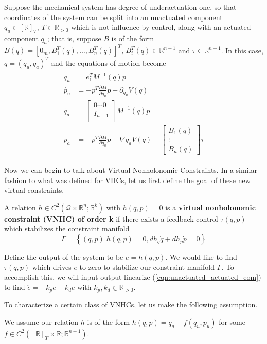 Suppose the mechanical system has degree of underactuation one, so that coordinates of the system can be split into an unactuated component \(q_u \in [\mathbb{R}]_T, \, T \in \mathbb{R}_{>0}\) which is not influence by control, along with an actuated component \(q_a\); that is, suppose \(B\) is of the form \(B(q) = [0_m, B_1^T(q), \ldots, B_n^T(q)]^T, \, B_i^T(q) \in \mathbb{R}^{n-1}\) and \(\tau \in \mathbb{R}^{n-1}\). In this case, \(q = (q_u, q_a)^T\) and the equations of motion become
\begin{align}\label{eqn:unactuated_actuated_eom}
\begin{split}
\dot{q_u} &= e_1^T M^{-1}(q) p \\
\dot{p_u} &= -p^T\frac{\partial M}{\partial q_u} p - \partial_{q_u}V(q) \\
\dot{q_a} &= 
\begin{bmatrix}
0 \cdots 0 \\
I_{n-1} \\
\end{bmatrix} M^{-1}(q) p \\
\dot{p_a} &= -p^T\frac{\partial M}{\partial q_a} p - \nabla{q_a}V(q) + 
\begin{bmatrix}
B_1(q) \\
\vdots \\
B_n(q)
\end{bmatrix} \tau
\end{split}
\end{align}

Now we can begin to talk about Virtual Nonholonomic Constraints. In a similar fashion to what was defined for VHCs, let us first define the goal of these new virtual constraints.

\begin{defn}
A relation \(h \in C^2\left(\mathcal{Q}\times \mathbb{R}^n ; \mathbb{R}^k\right)\) with \(h(q,p) = 0\) is a \textbf{virtual nonholonomic constraint (VNHC) of order k} if there exists a feedback control \(\tau(q,p)\) which stabilizes the constraint manifold
\[
\Gamma = \left\{(q,p) | h(q,p) = 0, dh_q \dot{q} + dh_p \dot{p} = 0\right\}
\]
\end{defn}
Define the output of the system to be \(e = h(q,p)\). We would like to find \(\tau(q,p)\) which drives \(e\) to zero to stabilize our constraint manifold \(\Gamma\). To accomplish this, we will input-output linearize (\ref{eqn:unactuated_actuated_eom}) to find \(\ddot{e} = -k_p e - k_d \dot{e}\) with \(k_p, k_d \in \mathbb{R}_{> 0}\).

To characterize a certain class of VNHCs, let us make the following assumption.
\begin{assm}\label{assm:vnhc_is_on_qu_pu}
We assume our relation \(h\) is of the form \(h(q,p) = q_a - f(q_u,p_u)\) for some \(f \in C^2\left([\mathbb{R}]_T \times \mathbb{R} ; \mathbb{R}^{n - 1}\right)\).
\end{assm}

